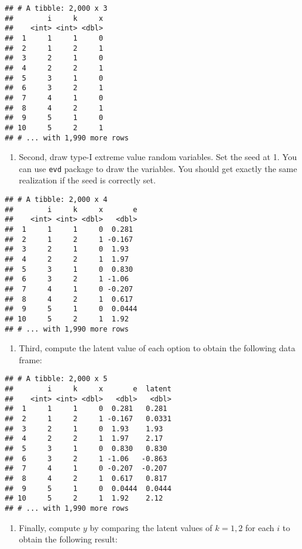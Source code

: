 \documentclass[
]{book}
\providecommand{\tightlist}{%
  \setlength{\itemsep}{0pt}\setlength{\parskip}{0pt}}
\begin{document}
\begin{verbatim}
## # A tibble: 2,000 x 3
##        i     k     x
##    <int> <int> <dbl>
##  1     1     1     0
##  2     1     2     1
##  3     2     1     0
##  4     2     2     1
##  5     3     1     0
##  6     3     2     1
##  7     4     1     0
##  8     4     2     1
##  9     5     1     0
## 10     5     2     1
## # ... with 1,990 more rows
\end{verbatim}

\begin{enumerate}
\def\labelenumi{\arabic{enumi}.}
\setcounter{enumi}{1}
\tightlist
\item
  Second, draw type-I extreme value random variables. Set the seed at 1. You can use \texttt{evd} package to draw the variables. You should get exactly the same realization if the seed is correctly set.
\end{enumerate}

\begin{verbatim}
## # A tibble: 2,000 x 4
##        i     k     x       e
##    <int> <int> <dbl>   <dbl>
##  1     1     1     0  0.281 
##  2     1     2     1 -0.167 
##  3     2     1     0  1.93  
##  4     2     2     1  1.97  
##  5     3     1     0  0.830 
##  6     3     2     1 -1.06  
##  7     4     1     0 -0.207 
##  8     4     2     1  0.617 
##  9     5     1     0  0.0444
## 10     5     2     1  1.92  
## # ... with 1,990 more rows
\end{verbatim}

\begin{enumerate}
\def\labelenumi{\arabic{enumi}.}
\setcounter{enumi}{2}
\tightlist
\item
  Third, compute the latent value of each option to obtain the following data frame:
\end{enumerate}

\begin{verbatim}
## # A tibble: 2,000 x 5
##        i     k     x       e  latent
##    <int> <int> <dbl>   <dbl>   <dbl>
##  1     1     1     0  0.281   0.281 
##  2     1     2     1 -0.167   0.0331
##  3     2     1     0  1.93    1.93  
##  4     2     2     1  1.97    2.17  
##  5     3     1     0  0.830   0.830 
##  6     3     2     1 -1.06   -0.863 
##  7     4     1     0 -0.207  -0.207 
##  8     4     2     1  0.617   0.817 
##  9     5     1     0  0.0444  0.0444
## 10     5     2     1  1.92    2.12  
## # ... with 1,990 more rows
\end{verbatim}

\begin{enumerate}
\def\labelenumi{\arabic{enumi}.}
\setcounter{enumi}{3}
\tightlist
\item
  Finally, compute \(y\) by comparing the latent values of \(k = 1, 2\) for each \(i\) to obtain the following result:
\end{enumerate}
\end{document}
